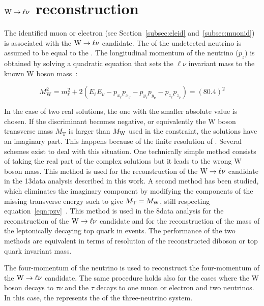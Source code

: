 \section{$\mathrm{W}\to\ell\nu$ reconstruction}\label{sec:leptonicW}

The identified muon or electron (see Section~\ref{subsec:eleid} and~\ref{subsec:muonid}) is associated with the $\mathrm{W}\to\ell\nu$ candidate. 
The \Vpt of the undetected neutrino is assumed to be equal to the \ptvecmiss. The longitudinal momentum of the neutrino ($p_z$) is obtained by solving a quadratic equation that sets the $\ell\nu$ invariant
mass to the known W boson mass~\cite{Agashe:2014kda}:

\begin{equation}\label{eqn:pzv}
M_\mathrm{W}^2 = m_\ell^2   + 2(E_\ell E_\nu - p_{x_\ell}p_{x_\nu} - p_{y_\ell}p_{y_\nu} - p_{z_\ell}p_{z_\nu} ) = (80.4)^2
\end{equation}

In the case of two real solutions, the one with the smaller absolute value is chosen.
If the discriminant becomes negative, or equivalently the W boson transverse mass $M_\mathrm{T}$ is larger than $M_\mathrm{W}$ used in the constraint, the solutions have an imaginary part. This happens because of the finite resolution of \ETmiss.
Several schemes exist to deal with this situation. One technically simple method consists of taking the real part of the complex solutions but it leads to the wrong W boson mass. This method is used for the reconstruction of the $\mathrm{W}\to\ell\nu$ candidate in the 13\TeV data analysis described in this work.
A second method has been studied, which eliminates the imaginary component by modifying the components of the missing transverse energy such to give $M_\mathrm{T} =  M_\mathrm{W}$, still respecting equation~\ref{eqn:pzv}~\cite{BauerPhd10}. This method is used in the 8\TeV data analysis for the reconstruction of the $\mathrm{W}\to\ell\nu$ candidate and for the reconstruction of the mass of the leptonically decaying top quark in \ttbar events. The performance of the two methods are equivalent in terms of resolution of the reconstructed diboson or top quark invariant mass.

The four-momentum of the neutrino is used to reconstruct the four-momentum of the $\mathrm{W}\to\ell\nu$ candidate.
The same procedure holds also for the cases where the W boson decays to $\tau\nu$ and the $\tau$ decays to one muon or electron and two neutrinos.
In this case, the \ptvecmiss represents the \Vpt of the three-neutrino system.
